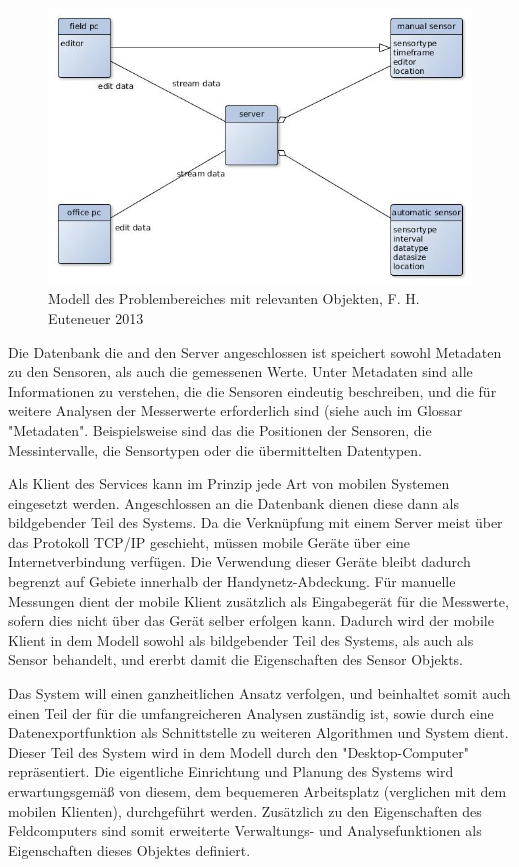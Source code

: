 \begin{figure}[H]
	\centering
 	 \includegraphics[scale=0.6]{graphics/model_of_issue.jpg} 
	\caption{Modell des Problembereiches mit relevanten Objekten, F. H. Euteneuer 2013}
	 \label{fig:model_domain}
\end{figure}

Die Datenbank die and den \gls{Server} angeschlossen ist speichert sowohl Metadaten zu den Sensoren, als auch die gemessenen Werte. Unter Metadaten sind alle Informationen zu verstehen, die die Sensoren eindeutig beschreiben, und die für weitere Analysen der Messerwerte erforderlich sind (siehe auch im Glossar "Metadaten". Beispielsweise sind das die Positionen der Sensoren, die Messintervalle, die Sensortypen oder die übermittelten Datentypen.

Als Klient des Services kann im Prinzip jede Art von mobilen Systemen eingesetzt werden. Angeschlossen an die Datenbank dienen diese dann als bildgebender Teil des Systems. Da die Verknüpfung mit einem \gls{Server} meist über das Protokoll  \gls{TCP/IP} geschieht, müssen mobile Geräte über eine Internetverbindung verfügen. Die Verwendung dieser Geräte bleibt dadurch begrenzt auf Gebiete innerhalb der Handynetz-Abdeckung. Für manuelle Messungen dient der mobile Klient zusätzlich als Eingabegerät für die Messwerte, sofern dies nicht über das Gerät selber erfolgen kann. Dadurch wird der mobile Klient in dem Modell sowohl als bildgebender Teil des Systems, als auch als Sensor behandelt, und ererbt damit die Eigenschaften des Sensor Objekts.

Das System will einen ganzheitlichen Ansatz verfolgen, und beinhaltet somit auch einen Teil der für die umfangreicheren Analysen zuständig ist, sowie durch eine Datenexportfunktion als Schnittstelle zu weiteren Algorithmen und System dient. Dieser Teil des System wird in dem Modell durch den "Desktop-Computer" repräsentiert. Die eigentliche Einrichtung und Planung des Systems wird erwartungsgemäß von diesem, dem bequemeren Arbeitsplatz (verglichen mit dem mobilen Klienten), durchgeführt werden. Zusätzlich zu den Eigenschaften des Feldcomputers sind somit erweiterte Verwaltungs- und Analysefunktionen als Eigenschaften dieses Objektes definiert.


